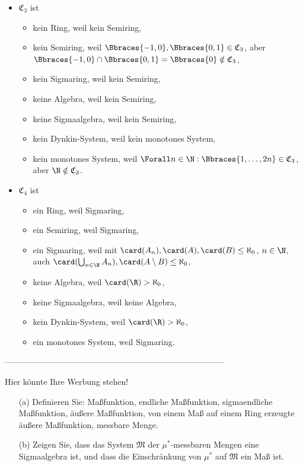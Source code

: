 \begin{solution}
\begin{itemize}
  \item $\mathfrak{C}_3$ ist
  \begin{itemize}
    \item kein Ring, weil kein Semiring,
    \item kein Semiring, weil $\Bbraces{-1, 0}, \Bbraces{0, 1} \in \mathfrak{C}_3$, aber $\Bbraces{-1, 0} \cap \Bbraces{0, 1} = \Bbraces{0} \notin \mathfrak{C}_3$,
    \item kein Sigmaring, weil kein Semiring,
    \item keine Algebra, weil kein Semiring,
    \item keine Sigmaalgebra, weil kein Semiring,
    \item kein Dynkin-System, weil kein monotones System,
    \item kein monotones System, weil $\Forall n \in \N: \Bbraces{1, \ldots, 2n} \in \mathfrak{C}_3$, aber $\N \notin \mathfrak{C}_3$.
  \end{itemize}

  \item $\mathfrak{C}_4$ ist
  \begin{itemize}
    \item ein Ring, weil Sigmaring,
    \item ein Semiring, weil Sigmaring,
    \item ein Sigmaring, weil mit $\card(A_n), \card(A), \card(B) \leq \aleph_0$, $n \in \N$, auch $\card(\bigcup_{n \in \N} A_n), \card(A \setminus B) \leq \aleph_0$,
    \item keine Algebra, weil $\card(\R) > \aleph_0$,
    \item keine Sigmaalgebra, weil keine Algebra,
    \item kein Dynkin-System, weil $\card(\R) > \aleph_0$,
    \item ein monotones System, weil Sigmaring.
  \end{itemize}

\end{itemize}

\end{solution}

--------------------------------------------------------------------------------

\begin{exercise}

Hier könnte Ihre Werbung stehen!

\begin{itemize}
  \item[(a)] Definieren Sie: Maßfunktion, endliche Maßfunktion, sigmaendliche Maßfunktion, äußere Maßfunktion, von einem Maß auf einem Ring erzeugte äußere Maßfunktion, messbare Menge.
  \item[(b)] Zeigen Sie, dass das System $\mathfrak{M}$ der $\mu^\ast$-messbaren Mengen eine Sigmaalgebra ist, und dass die Einschränkung von $\mu^\ast$ auf $\mathfrak{M}$ ein Maß ist.
\end{itemize}

\end{exercise}

